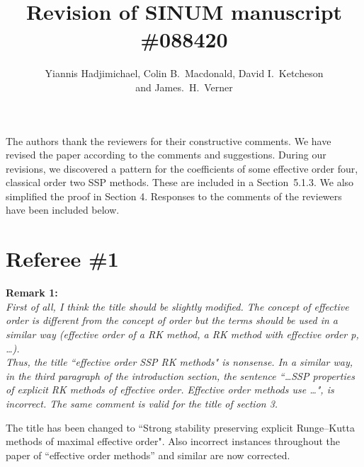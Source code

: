 \documentclass[12pt]{article}
\newcommand{\remark}[2]{\vspace{25pt} \noindent \textbf{Remark #1:\newline} \textit{#2}\vspace{15pt}}
\renewcommand{\newline}{\vspace{15pt}\\}
\begin{document}
\title{Revision of SINUM manuscript \#088420}
\author{Yiannis Hadjimichael, Colin B.~Macdonald, David I.~Ketcheson \\ and  James.~H.~Verner}

\maketitle

The authors thank the reviewers for their constructive comments.
We have revised the paper according to the comments and suggestions.
During our revisions, we discovered a pattern for the coefficients of some effective order four, 
classical order two SSP methods.
These are included in a Section~5.1.3.
We also simplified the proof in Section 4.
Responses to the comments of the reviewers have been included below.
\vspace{30pt}

\section*{Referee \#1}
\remark{1}
{First of all, I think the title should be slightly modified. 
The concept of \textit{effective order} is different from the concept of \textit{order} 
but the terms should be used in a similar way (\textit{effective order of a RK method, 
a RK method with effective order p, \dots}).
\newline
Thus, the title ``effective order SSP RK methods" is nonsense.
In a similar way, in the third paragraph of the introduction section, the sentence 
``\dots SSP properties of explicit RK methods of effective order. Effective order 
methods use \dots", is incorrect.
The same comment is valid for the title of section 3.}

The title has been changed to ``Strong stability preserving explicit Runge--Kutta methods of maximal effective order". 
Also incorrect instances throughout the paper of ``effective order methods'' and similar are now corrected.
\end{document}
